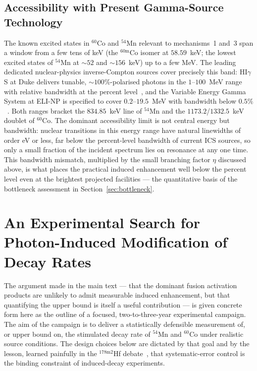 \documentclass[conference]{IEEEtran}
\begin{document}
\subsection{Accessibility with Present Gamma-Source Technology}
The known excited states in $^{60}$Co and $^{54}$Mn relevant to mechanisms~1 and~3 span a window from a few tens of keV (the $^{60\mathrm{m}}$Co isomer at $58.59$~keV; the lowest excited states of $^{54}$Mn at $\sim 52$ and $\sim 156$~keV) up to a few MeV. The leading dedicated nuclear-physics inverse-Compton sources cover precisely this band: HI$\gamma$S at Duke delivers tunable, $\sim 100\%$-polarised photons in the $1\text{--}100$~MeV range with relative bandwidth at the percent level~\cite{weller2009higs}, and the Variable Energy Gamma System at ELI-NP is specified to cover $0.2\text{--}19.5$~MeV with bandwidth below $0.5\%$~\cite{balabanski2018elinp}. Both ranges bracket the $834.85$~keV line of $^{54}$Mn and the $1173.2$/$1332.5$~keV doublet of $^{60}$Co. The dominant accessibility limit is not central energy but bandwidth: nuclear transitions in this energy range have natural linewidths of order eV or less, far below the percent-level bandwidth of current ICS sources, so only a small fraction of the incident spectrum lies on resonance at any one time. This bandwidth mismatch, multiplied by the small branching factor $\eta$ discussed above, is what places the practical induced enhancement well below the percent level even at the brightest projected facilities --- the quantitative basis of the bottleneck assessment in Section~\ref{sec:bottleneck}.

\section{An Experimental Search for Photon-Induced Modification of Decay Rates}
\label{app:experiment}

The argument made in the main text --- that the dominant fusion activation products are unlikely to admit measurable induced enhancement, but that quantifying the upper bound is itself a useful contribution --- is given concrete form here as the outline of a focused, two-to-three-year experimental campaign. The aim of the campaign is to deliver a statistically defensible measurement of, or upper bound on, the stimulated decay rate of $^{54}$Mn and $^{60}$Co under realistic source conditions. The design choices below are dictated by that goal and by the lesson, learned painfully in the $^{178\mathrm{m}2}$Hf debate~\cite{collins1999hafnium,ahmad2003hafnium}, that systematic-error control is the binding constraint of induced-decay experiments.
\end{document}
